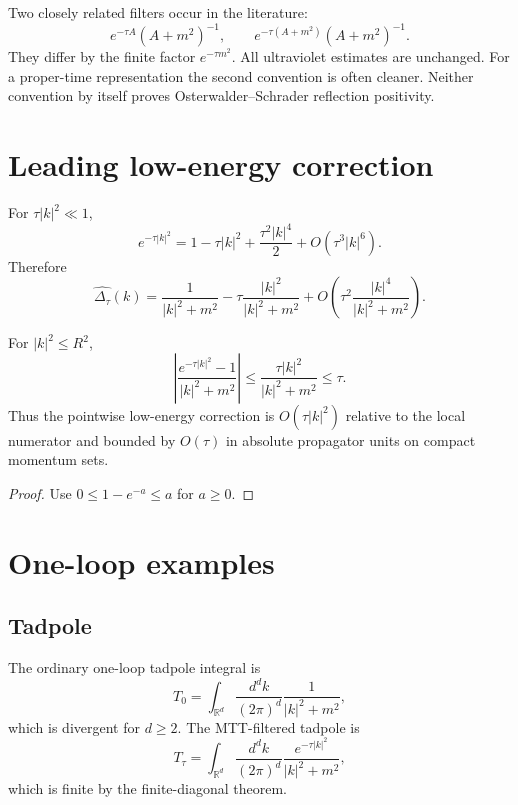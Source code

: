 \documentclass[11pt]{article}
\begin{document}
\begin{remark}
Two closely related filters occur in the literature:
\[
        e^{-\tau A}(A+m^2)^{-1},
        \qquad
        e^{-\tau(A+m^2)}(A+m^2)^{-1}.
\]
They differ by the finite factor \(e^{-\tau m^2}\).  All ultraviolet estimates are unchanged.
For a proper-time representation the second convention is often cleaner.  Neither convention
by itself proves Osterwalder--Schrader reflection positivity.
\end{remark}

\section{Leading low-energy correction}

For \(\tau |k|^2\ll1\),
\[
        e^{-\tau |k|^2}
        =
        1-\tau |k|^2+\frac{\tau^2|k|^4}{2}+O(\tau^3|k|^6).
\]
Therefore
\[
        \widehat{\Delta_\tau}(k)
        =
        \frac{1}{|k|^2+m^2}
        -
        \tau \frac{|k|^2}{|k|^2+m^2}
        +
        O\!\left(\tau^2\frac{|k|^4}{|k|^2+m^2}\right).
\]

\begin{proposition}
For \(|k|^2\le R^2\),
\[
        \left|
        \frac{e^{-\tau |k|^2}-1}{|k|^2+m^2}
        \right|
        \le
        \frac{\tau |k|^2}{|k|^2+m^2}
        \le
        \tau .
\]
Thus the pointwise low-energy correction is \(O(\tau |k|^2)\) relative to the local numerator and bounded by \(O(\tau)\) in absolute propagator units on compact momentum sets.
\end{proposition}

\begin{proof}
Use \(0\le 1-e^{-a}\le a\) for \(a\ge0\).
\end{proof}

\section{One-loop examples}

\subsection{Tadpole}

The ordinary one-loop tadpole integral is
\[
        T_0
        =
        \int_{\mathbb R^d}
        \frac{d^dk}{(2\pi)^d}
        \frac{1}{|k|^2+m^2},
\]
which is divergent for \(d\ge2\). The MTT-filtered tadpole is
\[
        T_\tau
        =
        \int_{\mathbb R^d}
        \frac{d^dk}{(2\pi)^d}
        \frac{e^{-\tau |k|^2}}{|k|^2+m^2},
\]
which is finite by the finite-diagonal theorem.
\end{document}
